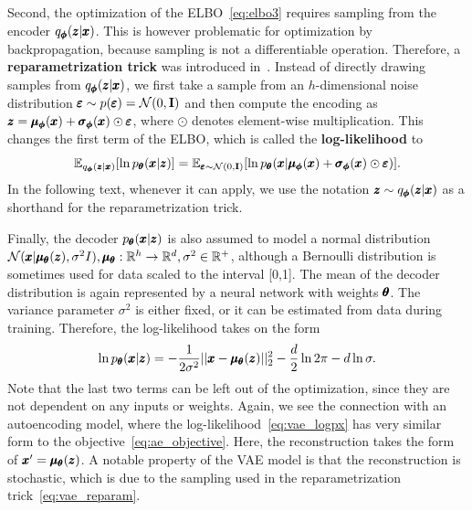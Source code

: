 Second, the optimization of the ELBO~\eqref{eq:elbo3} requires sampling from the encoder $q_{\pmb{{\phi}}}(\pmb{{z}}|\pmb{{x}})$. This is however problematic for optimization by backpropagation, because sampling is not a differentiable operation. Therefore, a \textbf{reparametrization trick} was introduced in~\cite{kingma2013vae}. Instead of directly drawing samples from $q_{\pmb{{\phi}}}(\pmb{{z}}|\pmb{{x}})$, we first take a sample from an $h$-dimensional noise distribution $\pmb{{\varepsilon}}\sim p(\pmb{{\varepsilon}})=\mathcal{N}(0,\mathbf{I})$ and then compute the encoding as $\pmb{{z}}=\pmb{{\mu}}_{\pmb{{\phi}}}(\pmb{{x}})+\pmb{{\sigma}}_{\pmb{{\phi}}}(\pmb{{x}}) \odot \pmb{{\varepsilon}}$, where $\odot$ denotes element-wise multiplication. This changes the first term of the ELBO, which is called the \textbf{log-likelihood} to
\begin{equation} \label{eq:vae_reparam}
\mathbb{E}_{q_{\vc{\phi}}(\vc{z}|\vc{x})}\left[\ln p_{\vc{\theta}}(\vc{x}|\vc{z})\right] = \mathbb{E}_{\vc{\varepsilon}\sim\mathcal{N}(0,\textbf{I})}\left[\ln p_{\vc{\theta}}(\vc{x}| \vc{\mu}_{\vc{\phi}}(\vc{x})+\vc{\sigma}_{\vc{\phi}}(\vc{x}) \odot \vc{\varepsilon} )\right].
\end{equation}
In the following text, whenever it can apply, we use the notation $\pmb{{z}} \sim q_{\pmb{{\phi}}}(\pmb{{z}}|\pmb{{x}})$ as a shorthand for the reparametrization trick.

Finally, the decoder $p_{\pmb{{\theta}}}(\pmb{{x}}|\pmb{{z}})$ is also assumed to model a normal distribution\\ $\mathcal{N}(\pmb{{x}}|\pmb{{\mu}}_{\pmb{{\theta}}}(\pmb{{z}}),\sigma^2 I), \pmb{{\mu}}_{\pmb{{\theta}}} :\mathbb{R}^h \rightarrow \mathbb{R}^d, \sigma^2\in\mathbb{R}^+$, although a Bernoulli distribution is sometimes used for data scaled to the interval [0,1]. The mean of the decoder distribution is again represented by a neural network with weights $\pmb{{\theta}}$. The variance parameter $\sigma^2$ is either fixed, or it can be estimated from data during training. Therefore, the log-likelihood takes on the form 
\begin{equation} \label{eq:vae_logpx}
\ln p_{\pmb{{\theta}}}(\pmb{{x}}|\pmb{{z}}) = - \frac{1}{2\sigma^2} \vert \vert \pmb{{x}} - \pmb{{\mu}}_{\pmb{{\theta}}}(\pmb{{z}}) \vert \vert_2^2 - \frac{d}{2} \ln 2\pi - d \ln \sigma. 
\end{equation}
Note that the last two terms can be left out of the optimization, since they are not dependent on any inputs or weights. Again, we see the connection with an autoencoding model, where the log-likelihood~\eqref{eq:vae_logpx} has very similar form to the objective~\eqref{eq:ae_objective}. Here, the reconstruction takes the form of $\pmb{{x}}' = \pmb{{\mu}}_{\pmb{{\theta}}}(\pmb{{z}})$. A notable property of the VAE model is that the reconstruction is stochastic, which is due to the sampling used in the reparametrization trick~\eqref{eq:vae_reparam}. 

